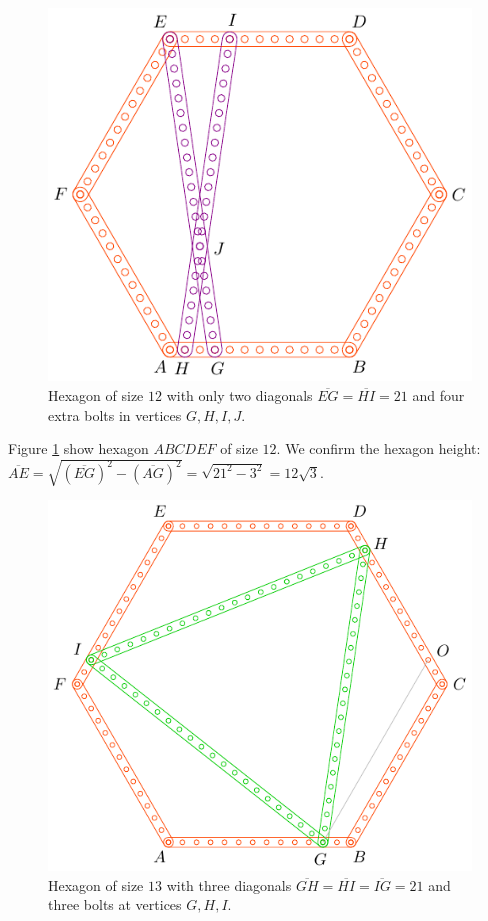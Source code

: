 \documentclass[11pt]{article}
\begin{document}
\begin{figure}[H]
\centering
\includegraphics[scale=1]{12/hexa-12a}
\caption{Hexagon of size $12$ with only two diagonals $\overline{EG} = \overline{HI} = 21$ and four extra bolts in vertices $G,H,I,J$.}
\label{fig:12a}
\end{figure}

Figure \ref{fig:12a} show hexagon $ABCDEF$ of size $12$. We confirm the hexagon height: $\overline{AE} = \sqrt{(\overline{EG})^2 - (\overline{AG})^2} = \sqrt{21^2 - 3^2} = 12\sqrt3$.


\begin{figure}[H]
\centering
\includegraphics[scale=1]{13/hexa-13a}
\caption{Hexagon of size $13$ with three diagonals $\overline{GH} = \overline{HI} = \overline{IG} = 21$ and three bolts at vertices $G,H,I$.}
\label{fig:13a}
\end{figure}
\end{document}

